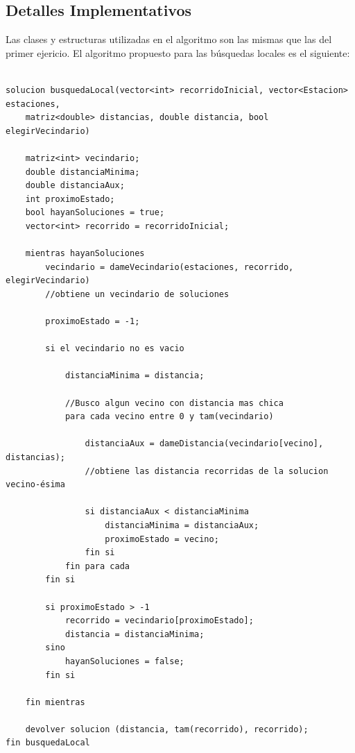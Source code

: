     \subsection{Detalles Implementativos}

    
    Las clases y estructuras utilizadas en el algoritmo son las mismas que las del primer ejericio. El algoritmo propuesto para las búsquedas locales es el siguiente: 

            \begin{codesnippet}
            \begin{verbatim}

solucion busquedaLocal(vector<int> recorridoInicial, vector<Estacion> estaciones, 
    matriz<double> distancias, double distancia, bool elegirVecindario)
    
    matriz<int> vecindario;
    double distanciaMinima;
    double distanciaAux;
    int proximoEstado;
    bool hayanSoluciones = true;
    vector<int> recorrido = recorridoInicial;

    mientras hayanSoluciones
        vecindario = dameVecindario(estaciones, recorrido, elegirVecindario)
        //obtiene un vecindario de soluciones
        
        proximoEstado = -1;

        si el vecindario no es vacio
            
            distanciaMinima = distancia;
            
            //Busco algun vecino con distancia mas chica
            para cada vecino entre 0 y tam(vecindario)
                
                distanciaAux = dameDistancia(vecindario[vecino], distancias);
                //obtiene las distancia recorridas de la solucion vecino-ésima

                si distanciaAux < distanciaMinima
                    distanciaMinima = distanciaAux;
                    proximoEstado = vecino;
                fin si
            fin para cada
        fin si
    
        si proximoEstado > -1
            recorrido = vecindario[proximoEstado];
            distancia = distanciaMinima;
        sino
            hayanSoluciones = false;
        fin si

    fin mientras

    devolver solucion (distancia, tam(recorrido), recorrido);
fin busquedaLocal
            \end{verbatim}
            \end{codesnippet}


